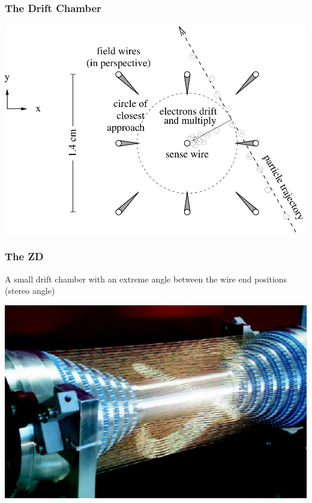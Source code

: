 \documentclass[12pt,compress]{beamer}
\begin{document}
\begin{frame}
\frametitle{The Drift Chamber}
\begin{center}
\includegraphics[width=\linewidth]{driftcell}
\end{center}
\end{frame}

\begin{frame}
\frametitle{The ZD} A small drift chamber with an extreme angle between the wire end positions (stereo angle)
\begin{center}
\includegraphics[width=0.9\linewidth]{cleo_zd}
\end{center}
\end{frame}
\end{document}
